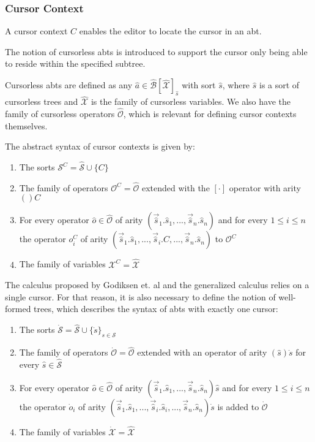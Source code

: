 \documentclass{article}
\begin{document}
\subsubsection{Cursor Context}
A cursor context $C$ enables the editor to locate the cursor in an abt.

The notion of cursorless abts is introduced to support the cursor only being able to reside within the specified subtree.

Cursorless abts are defined as any $\hat{a} \in \hat{\mathcal{B}}[\hat{\mathcal{X}}]_{\hat{s}}$ with sort $\hat{s}$, where $\hat{s}$ is a sort of cursorless trees and $\hat{\mathcal{X}}$ is the family of cursorless variables. We also have the family of cursorless operators $\hat{\mathcal{O}}$, which is relevant for defining cursor contexts themselves.

The abstract syntax of cursor contexts is given by:
\begin{enumerate}
    \item The sorts $\mathcal{S}^C = \hat{\mathcal{S}} \cup \{C\}$
    \item The family of operators $\mathcal{O}^C = \hat{\mathcal{O}}$ extended with the $[\cdot]$ operator with arity $()C$
    \item For every operator $\hat{o} \in \hat{\mathcal{O}}$ of arity $(\vec{\hat{s}}_1.\hat{s}_1,...,\vec{\hat{s}}_n.\hat{s}_n)$ and for every $1 \leq i \leq n$ the operator $o_i^C$ of arity $(\vec{\hat{s}}_1.\hat{s}_1,...,\vec{\hat{s}}_i.C,...,\vec{\hat{s}}_n.\hat{s}_n)$ to $\mathcal{O}^C$
    \item The family of variables $\mathcal{X}^C = \hat{\mathcal{X}}$
\end{enumerate}

The calculus proposed by Godiksen et. al and the generalized calculus relies on a single cursor. For that reason, it is also necessary to define the notion of well-formed trees, which describes the syntax of abts with exactly one cursor:

\begin{enumerate}
    \item The sorts $\dot{\mathcal{S}} = \hat{\mathcal{S}} \cup \{ \dot{s} \}_{s \in \mathcal{S}}$
    \item The family of operators $\dot{\mathcal{O}} = \hat{\mathcal{O}}$ extended with an operator of arity $(\hat{s})\dot{s}$ for every $\hat{s} \in \hat{\mathcal{S}}$
    \item For every operator $\hat{o} \in \hat{\mathcal{O}}$ of arity $(\vec{\hat{s}}_1.\hat{s}_1,...,\vec{\hat{s}}_n.\hat{s}_n)\hat{s}$ and for every $1 \leq i \leq n$ the operator $\dot{o}_i$ of arity $(\vec{\hat{s}}_1.\hat{s}_1,...,\vec{\hat{s}}_i.\hat{s}_i,...,\vec{\hat{s}}_n.\hat{s}_n)\dot{s}$ is added to $\dot{\mathcal{O}}$
    \item The family of variables $\dot{\mathcal{X}} = \hat{\mathcal{X}}$
\end{enumerate}
\end{document}
